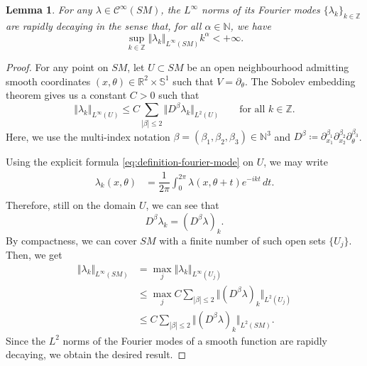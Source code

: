 \documentclass[reqno,12pt,letterpaper]{amsart}
\newtheorem{lemma}[proposition]{Lemma}
\theoremstyle{definition}
\theoremstyle{remark}
\theoremstyle{definition}
\numberwithin{equation}{section}
\newcommand{\N}{\mathbb{N}}
\newcommand{\R}{\mathbb{R}}
\newcommand{\Z}{\mathbb{Z}}
\begin{document}
\begin{lemma}\label{lemma:rapid-decay}
For any $\lambda\in \mathcal{C}^\infty(SM)$, 
the $L^\infty$ norms of its Fourier modes $\{\lambda_k\}_{k\in \Z}$ are rapidly decaying in the sense that, for all $\alpha\in \N$, we have
\begin{equation*}
\sup_{k\in \Z}  \Vert \lambda_{k}\Vert_{L^\infty(SM)}k^\alpha<+\infty.
\end{equation*}
\end{lemma}
\begin{proof}
For any point on $SM$, let $U\subset SM$ be an open neighbourhood admitting smooth coordinates $(x, \theta)\in \R^2\times \mathbb{S}^1$ such that $V= \partial_\theta$. The Sobolev embedding theorem gives us a constant $C>0$ such that
\begin{equation*}
\Vert \lambda_k\Vert_{L^\infty(U)}\leq C\sum_{|\beta|\leq 2}\Vert D^\beta \lambda_k\Vert_{L^2(U)} \qquad \text{for all } k\in \Z.
\end{equation*}
Here, we use the multi-index notation $\beta=(\beta_1, \beta_2, \beta_3)\in \N^3$ and $D^\beta\coloneqq\partial_{x_1}^{\beta_1}\partial_{x_2}^{\beta_2}\partial_\theta^{\beta_3}$. 

Using the explicit formula \eqref{eq:definition-fourier-mode} on $U$, we may write
\begin{equation*}%
\begin{alignedat}{1}
\lambda_k(x, \theta)&=\dfrac{1}{2\pi}\int_0^{2\pi} \lambda(x, \theta+t)e^{-ikt} \, dt.\\
\end{alignedat}
\end{equation*}
Therefore, still on the domain $U$, we can see that
$$D^\beta \lambda_k= (D^\beta \lambda)_k.$$
By compactness, we can cover $SM$ with a finite number of such open sets $\{ U_j\}$. Then, we get
\begin{equation*}
\begin{alignedat}{1}
\Vert \lambda_k \Vert_{L^\infty(SM)} &= \max_{j} \Vert \lambda_k \Vert_{L^\infty(U_j)}\\
&\leq \max_{j}  C \sum_{|\beta|\leq 2} \Vert (D^\beta\lambda)_k\Vert_{L^2(U_j)}\\
&\leq C \sum_{|\beta|\leq 2} \Vert (D^\beta\lambda)_k\Vert_{L^2(SM)}.
\end{alignedat}
\end{equation*}
Since the $L^2$ norms of the Fourier modes of a smooth function are rapidly decaying, we obtain the desired result. 
\end{proof}
\end{document}
